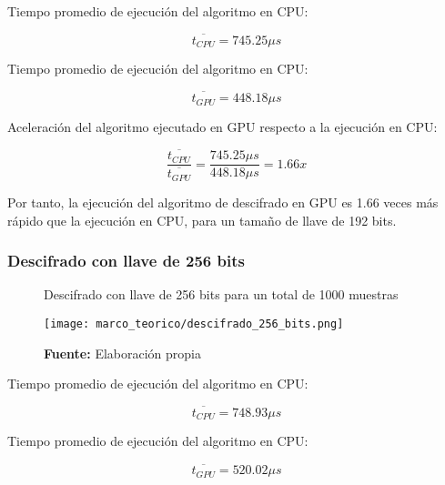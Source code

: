 \documentclass[../main/main.tex]{subfiles}
\begin{document}
        Tiempo promedio de ejecución del algoritmo en CPU:

        \vspace{-0.7cm}\begin{equation}
          \overline{t_{CPU}} = 745.25\mu s
        \end{equation}

        Tiempo promedio de ejecución del algoritmo en CPU:

        \vspace{-0.7cm}\begin{equation}
          \overline{t_{GPU}} = 448.18\mu s
        \end{equation}

        Aceleración del algoritmo ejecutado en GPU respecto a la ejecución en CPU:

        \vspace{-0.7cm}\begin{equation}
          \frac{\overline{t_{CPU}}}{\overline{t_{GPU}}} = \frac{745.25\mu s}{448.18\mu s} = 1.66x
        \end{equation}

        Por tanto, la ejecución del algoritmo de descifrado en GPU es 1.66 veces más rápido que la ejecución en CPU, para un tamaño de llave de 192 bits.

      \subsubsection{Descifrado con llave de 256 bits}

        \begin{figure}[H]
          \centering
          \caption{Descifrado con llave de 256 bits para un total de 1000 muestras}
          \texttt{[image: marco\_teorico/descifrado\_256\_bits.png]}
          \caption*{\textbf{Fuente:} Elaboración propia}
        \end{figure}

        Tiempo promedio de ejecución del algoritmo en CPU:

        \vspace{-0.7cm}\begin{equation}
          \overline{t_{CPU}} = 748.93\mu s
        \end{equation}

        Tiempo promedio de ejecución del algoritmo en CPU:

        \vspace{-0.7cm}\begin{equation}
          \overline{t_{GPU}} = 520.02\mu s
        \end{equation}
\end{document}
